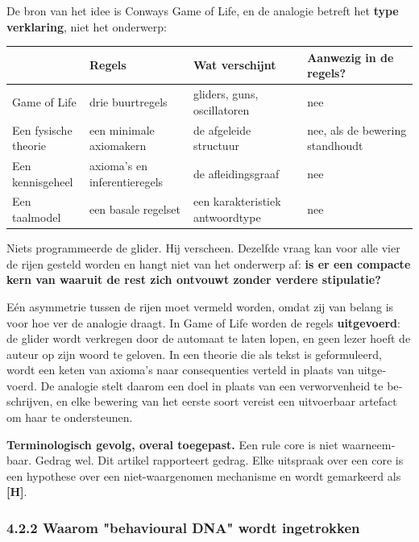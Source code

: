 \begin{dutch}
De bron van het idee is Conways Game of Life, en de analogie betreft het \textbf{type verklaring}, niet het onderwerp:

\begin{center}
\small
\begin{tabularx}{\linewidth}{>{\raggedright\arraybackslash}X>{\raggedright\arraybackslash}X>{\raggedright\arraybackslash}X>{\raggedright\arraybackslash}X}
\toprule
 & \textbf{Regels} & \textbf{Wat verschijnt} & \textbf{Aanwezig in de regels?} \\
\midrule
Game of Life & drie buurtregels & gliders, guns, oscillatoren & nee \\
Een fysische theorie & een minimale axiomakern & de afgeleide structuur & nee, als de bewering standhoudt \\
Een kennisgeheel & axioma's en inferentieregels & de afleidingsgraaf & nee \\
Een taalmodel & een basale regelset & een karakteristiek antwoordtype & nee \\
\bottomrule
\end{tabularx}
\end{center}
Niets programmeerde de glider. Hij verscheen. Dezelfde vraag kan voor alle vier de rijen gesteld worden en hangt niet van het onderwerp af: \textbf{is er een compacte kern van waaruit de rest zich ontvouwt zonder verdere stipulatie?}

Eén asymmetrie tussen de rijen moet vermeld worden, omdat zij van belang is voor hoe ver de analogie draagt. In Game of Life worden de regels \textbf{uitgevoerd}: de glider wordt verkregen door de automaat te laten lopen, en geen lezer hoeft de auteur op zijn woord te geloven. In een theorie die als tekst is geformuleerd, wordt een keten van axioma's naar consequenties verteld in plaats van uitgevoerd. De analogie stelt daarom een doel in plaats van een verworvenheid te beschrijven, en elke bewering van het eerste soort vereist een uitvoerbaar artefact om haar te ondersteunen.

\textbf{Terminologisch gevolg, overal toegepast.} Een rule core is niet waarneembaar. Gedrag wel. Dit artikel rapporteert gedrag. Elke uitspraak over een core is een hypothese over een niet-waargenomen mechanisme en wordt gemarkeerd als \textbf{[H]}.


\subsubsection*{4.2.2 Waarom "behavioural DNA" wordt ingetrokken}
\label{sec:nl:4.2.2}


\end{dutch}
